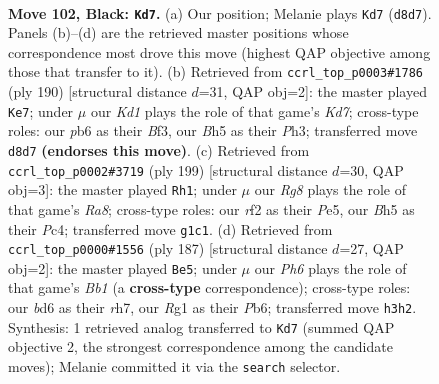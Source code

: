 \documentclass[11pt]{article}
\begin{document}
\clearpage

\begin{figure}[p]\centering
\begin{subfigure}{0.46\textwidth}\centering
\resizebox{\linewidth}{!}{%
\newchessgame
\chessboard[
  setfen={3k4/8/PP1B4/3N3b/4B3/1K5p/5R2/6r1 b - - 4 102},
  showmover=false,
  pgfstyle=straightmove, color=movearrow, markmove={d8-d7}
]}
\caption{}
\end{subfigure}\hfill
\begin{subfigure}{0.46\textwidth}\centering
\resizebox{\linewidth}{!}{%
\newchessgame
\chessboard[
  setfen={8/3K4/5p2/2k2Pb1/P6p/5B1P/8/8 w - - 86 96},
  showmover=false,
  pgfstyle=straightmove, color=movearrow, markmove={d7-e7}
]}
\caption{}
\end{subfigure}
\\[4pt]
\begin{subfigure}{0.46\textwidth}\centering
\resizebox{\linewidth}{!}{%
\newchessgame
\chessboard[
  setfen={8/6k1/5p2/4pP2/2p3P1/2N5/3B1K2/r7 b - - 55 100},
  showmover=false,
  pgfstyle=straightmove, color=movearrow, markmove={a1-h1}
]}
\caption{}
\end{subfigure}\hfill
\begin{subfigure}{0.46\textwidth}\centering
\resizebox{\linewidth}{!}{%
\newchessgame
\chessboard[
  setfen={1b3k2/7R/1p2p3/1B1b4/P5K1/8/8/8 b - - 4 94},
  showmover=false,
  pgfstyle=straightmove, color=movearrow, markmove={b8-e5}
]}
\caption{}
\end{subfigure}
\caption{\textbf{Move 102, Black: \texttt{Kd7}.} (a) Our position; Melanie plays \texttt{Kd7} (\texttt{d8d7}). Panels (b)--(d) are the retrieved master positions whose correspondence most drove this move (highest QAP objective among those that transfer to it). (b) Retrieved from \texttt{ccrl\_top\_p0003\#1786} (ply 190) [structural distance $d$=31, QAP obj=2]: the master played \texttt{Ke7}; under $\mu$ our \emph{Kd1} plays the role of that game's \emph{Kd7}; cross-type roles: our \emph{p}b6 as their \emph{B}f3, our \emph{B}h5 as their \emph{P}h3; transferred move \texttt{d8d7} \textbf{(endorses this move)}. (c) Retrieved from \texttt{ccrl\_top\_p0002\#3719} (ply 199) [structural distance $d$=30, QAP obj=3]: the master played \texttt{Rh1}; under $\mu$ our \emph{Rg8} plays the role of that game's \emph{Ra8}; cross-type roles: our \emph{r}f2 as their \emph{P}e5, our \emph{B}h5 as their \emph{P}c4; transferred move \texttt{g1c1}. (d) Retrieved from \texttt{ccrl\_top\_p0000\#1556} (ply 187) [structural distance $d$=27, QAP obj=2]: the master played \texttt{Be5}; under $\mu$ our \emph{Ph6} plays the role of that game's \emph{Bb1} (a \textbf{cross-type} correspondence); cross-type roles: our \emph{b}d6 as their \emph{r}h7, our \emph{R}g1 as their \emph{P}b6; transferred move \texttt{h3h2}. Synthesis: 1 retrieved analog transferred to \texttt{Kd7} (summed QAP objective 2, the strongest correspondence among the candidate moves); Melanie committed it via the \texttt{search} selector.}
\label{fig:thought-m203}
\end{figure}
\end{document}
